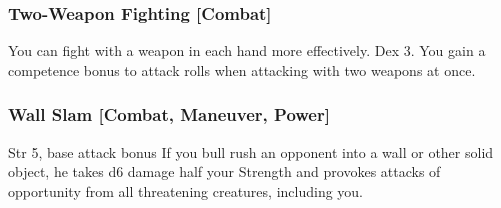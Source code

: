 \subsubsection{Two-Weapon Fighting [Combat]}
You can fight with a weapon in each hand more effectively.
 Dex 3.
 You gain a  competence bonus to attack rolls when attacking with two weapons at once.


\subsubsection{Wall Slam [Combat, Maneuver, Power]}
\featpre Str 5, base attack bonus 
\featben If you bull rush an opponent into a wall or other solid object, he takes d6 damage \add half your Strength and provokes attacks of opportunity from all threatening creatures, including you.

